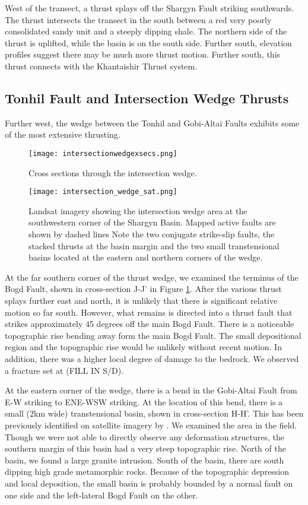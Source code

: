 West of the transect, a thrust splays off the Shargyn Fault striking southwards. The thrust intersects the transect in the south between a red very poorly consolidated sandy unit and a steeply dipping shale. The northern side of the thrust is uplifted, while the basin is on the south side. Further south, elevation profiles suggest there may be much more thrust motion. Further south, this thrust connects with the Khantaishir Thrust system. 

\subsection{Tonhil Fault and Intersection Wedge Thrusts}
Further west, the wedge between the Tonhil and Gobi-Altai Faults exhibits some of the most extensive thrusting. 

\begin{figure}[h!]
  \centering
  \texttt{[image: intersectionwedgexsecs.png]}
  \caption{Cross sections through the intersection wedge.}
  \label{intersectionwedgexsecs}
\end{figure}

\begin{figure}[h!]
  \centering
  \texttt{[image: intersection\_wedge\_sat.png]}
  \caption{Landsat imagery showing the intersection wedge area at the southwestern corner of the Shargyn Basin. Mapped active faults are shown by dashed lines Note the two conjugate strike-slip faults, the stacked thrusts at the basin margin and the two small transtensional basins located at the eastern and northern corners of the wedge.}
\end{figure}


At the far southern corner of the thrust wedge, we examined the terminus of the Bogd Fault, shown in cross-section J-J' in Figure \ref{intersectionwedgexsecs}. After the various thrust splays further east and north, it is unlikely that there is significant relative motion so far south. However, what remains is directed into a thrust fault that strikes approximately 45 degrees off the main Bogd Fault. There is a noticeable topographic rise bending away form the main Bogd Fault. The small depositional region and the topographic rise would be unlikely without recent motion. In addition, there was a higher local degree of damage to the bedrock. We observed a fracture set at (FILL IN S/D). 

At the eastern corner of the wedge, there is a bend in the Gobi-Altai Fault from E-W striking to ENE-WSW striking. At the location of this bend, there is a small (2km wide) transtensional basin, shown in cross-section H-H'. This has been previously identified on satellite imagery by \citet{Cunningham2010}. We examined the area in the field. Though we were not able to directly observe any deformation structures, the southern margin of this basin had a very steep topographic rise. North of the basin, we found a large granite intrusion. South of the basin, there are south dipping high grade metamorphic rocks. Because of the topographic depression and local deposition, the small basin is probably bounded by a normal fault on one side and the left-lateral Bogd Fault on the other. 

